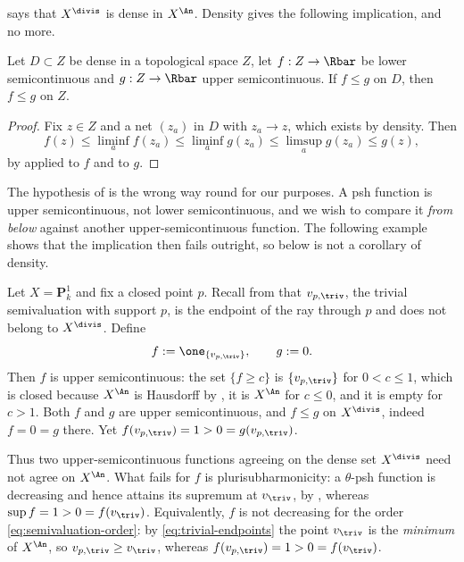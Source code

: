  says that $X^{\divis}$ is dense in
$X^{\An}$.  Density gives the following implication, and no more.

\begin{lemma}
\label{lem:ch35-density-gives}
Let $D\subset Z$ be dense in a topological space $Z$, let
$f:Z\to\Rbar$ be lower semicontinuous and $g:Z\to\Rbar$ upper
semicontinuous.  If $f\leq g$ on $D$, then $f\leq g$ on $Z$.
\end{lemma}

\begin{proof}
Fix $z\in Z$ and a net $(z_a)$ in $D$ with $z_a\to z$, which exists
by density.  Then
\[
 f(z)\leq\liminf_af(z_a)\leq\liminf_ag(z_a)
 \leq\limsup_ag(z_a)\leq g(z),
\]
by  applied to $f$ and to $g$.
\end{proof}

The hypothesis of  is the wrong way round for
our purposes.  A psh function is upper semicontinuous, not lower
semicontinuous, and we wish to compare it \emph{from below} against another
upper-semicontinuous function.  The following example shows that the
implication then fails outright, so
 below is not a corollary of density.

\begin{example}
\label{ex:ch35-usc-not-determined}
Let $X=\mathbf P^1_k$ and fix a closed point $p$.  Recall from
 that $v_{p,\triv}$, the trivial semivaluation with
support $p$, is the endpoint of the ray through $p$ and does not belong
to $X^{\divis}$.  Define
\[
 f:=\one_{\{v_{p,\triv}\}},
 \qquad
 g:=0 .
\]
Then $f$ is upper semicontinuous: the set $\{f\geq c\}$ is
$\{v_{p,\triv}\}$ for $0<c\leq1$, which is closed because
$X^{\An}$ is Hausdorff by , it is
$X^{\An}$ for $c\leq0$, and it is empty for $c>1$.  Both $f$ and
$g$ are upper semicontinuous, and $f\leq g$ on
$X^{\divis}$, indeed $f=0=g$ there.  Yet $f(v_{p,\triv})=1>0=g(v_{p,\triv})$.

Thus two upper-semicontinuous functions agreeing on the dense set
$X^{\divis}$ need not agree on $X^{\An}$.  What fails for $f$ is
plurisubharmonicity: a $\theta$-psh function is decreasing and hence
attains its supremum at $v_{\triv}$, by
\cite[Proposition~4.12]{BJ22}, whereas
$\sup f=1>0=f(v_{\triv})$.  Equivalently, $f$ is not decreasing for the
order \eqref{eq:semivaluation-order}: by \eqref{eq:trivial-endpoints} the
point $v_{\triv}$ is the \emph{minimum} of $X^{\An}$, so
$v_{p,\triv}\geq v_{\triv}$, whereas
$f(v_{p,\triv})=1>0=f(v_{\triv})$.
\end{example}

